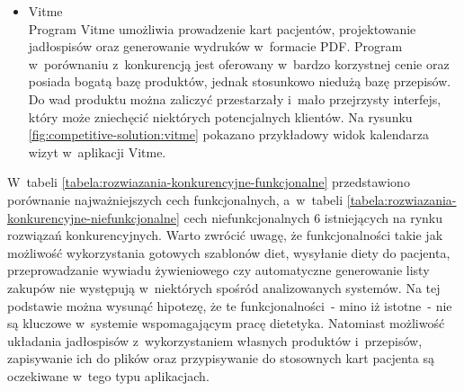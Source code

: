 \begin{itemize}

    \item Vitme\\
        Program Vitme\cite{url:vitme} umożliwia prowadzenie kart pacjentów, projektowanie jadłospisów oraz generowanie wydruków w~formacie PDF.
        Program w~porównaniu z~konkurencją jest oferowany w~bardzo korzystnej cenie oraz posiada bogatą bazę produktów, jednak stosunkowo niedużą bazę przepisów.
        Do wad produktu można zaliczyć przestarzały i~mało przejrzysty interfejs, który może zniechęcić niektórych potencjalnych klientów.
        Na rysunku \ref{fig:competitive-solution:vitme} pokazano przykładowy widok kalendarza wizyt w~aplikacji Vitme.


\end{itemize}

W~tabeli \ref{tabela:rozwiazania-konkurencyjne-funkcjonalne} przedstawiono porównanie najważniejszych cech funkcjonalnych,
a~w~tabeli \ref{tabela:rozwiazania-konkurencyjne-niefunkcjonalne} cech niefunkcjonalnych
6 istniejących na rynku rozwiązań konkurencyjnych\cite{url:porownanie-programow-dietetycznych}.
Warto zwrócić uwagę, że funkcjonalności takie jak możliwość wykorzystania gotowych szablonów diet, wysyłanie diety do pacjenta,
przeprowadzanie wywiadu żywieniowego czy automatyczne generowanie listy zakupów nie występują w~niektórych spośród analizowanych systemów.
Na tej podstawie można wysunąć hipotezę, że te funkcjonalności~- mino iż istotne~- nie są kluczowe w~systemie wspomagającym pracę dietetyka.
Natomiast możliwość układania jadłospisów z~wykorzystaniem własnych produktów i~przepisów,
zapisywanie ich do plików oraz przypisywanie do stosownych kart pacjenta są oczekiwane w~tego typu aplikacjach.

